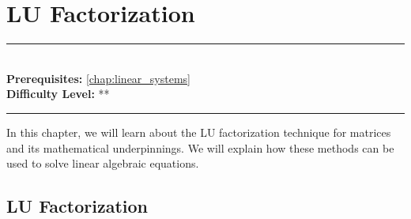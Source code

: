 \documentclass[book.tex]{subfiles}
\begin{document}
\chapter{LU Factorization}
\label{chap:lu_factorization}
\noindent\rule{11cm}{0.4pt} \\
\textbf{Prerequisites:} \autoref{chap:linear_systems} \\
\textbf{Difficulty Level:} ** \\
\noindent\rule{11cm}{0.4pt}
\vspace{5mm}

In this chapter, we will learn about the LU factorization technique for matrices and its mathematical underpinnings. We will explain how these methods can be used to solve linear algebraic equations.

\section{LU Factorization}
\end{document}
